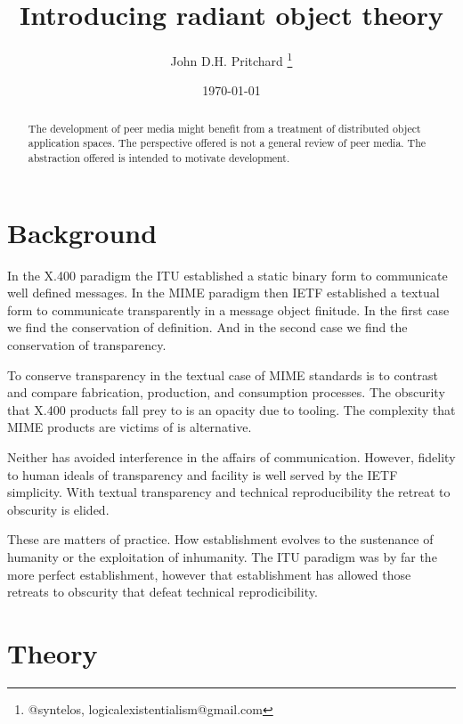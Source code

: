 \documentclass[12pt,twocolumn]{article}
\begin{document}
\title{Introducing radiant object theory}

\author{John D.H. Pritchard \thanks{@syntelos, logicalexistentialism@gmail.com}}

\date{\today}

\maketitle


\begin{abstract}

The development of peer media might benefit from a treatment of
distributed object application spaces.  The perspective offered is not
a general review of peer media.  The abstraction offered is intended
to motivate development.
  
\end{abstract}


\section{Background}

In the X.400 \cite{X400} paradigm the ITU established a static binary
form to communicate well defined messages.  In the MIME \cite{RFC2045}
paradigm then IETF established a textual form to communicate
transparently in a message object finitude.  In the first case we find
the conservation of definition.  And in the second case we find the
conservation of transparency.

To conserve transparency in the textual case of MIME standards is to
contrast and compare fabrication, production, and consumption
processes.  The obscurity that X.400 products fall prey to is an
opacity due to tooling.  The complexity that MIME products are victims
of is alternative.

Neither has avoided interference in the affairs of communication.
However, fidelity to human ideals of transparency and facility is well
served by the IETF simplicity.  With textual transparency and
technical reproducibility the retreat to obscurity is elided.

These are matters of practice.  How establishment evolves to the
sustenance of humanity or the exploitation of inhumanity.  The ITU
paradigm was by far the more perfect establishment, however that
establishment has allowed those retreats to obscurity that defeat
technical reprodicibility.

\section{Theory}
\end{document}
